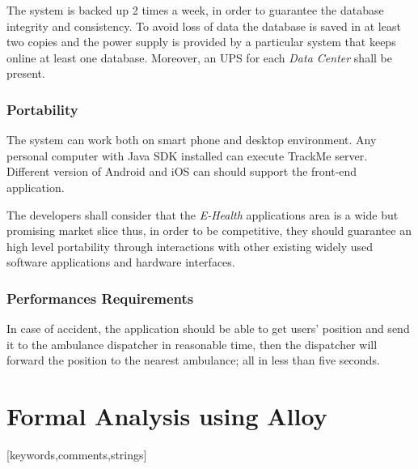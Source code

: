 \documentclass[a4paper]{article}
\begin{document}
        The system is backed up 2 times a  week, in order to guarantee the database integrity and consistency. To avoid loss of data  the database is saved in at least two copies and the power supply is provided by a particular system that keeps online at least one database. Moreover, an UPS for each \textit{Data Center} shall be present.
        
        \subsubsection{Portability}

        The system can work both on smart phone and desktop environment. Any personal computer with Java SDK installed can execute TrackMe server. Different version of Android and iOS can should support the front-end application.

        The developers shall consider that the \textit{E-Health} applications area is a wide but promising market slice thus, in order to be competitive, they should guarantee an high level portability through interactions with other existing widely used software applications and hardware interfaces.
        
        \subsubsection{Performances Requirements}
        
        In case of accident, the application should be able to get users' position and send it to the ambulance dispatcher in reasonable time, then the dispatcher will forward the position to the nearest ambulance; all in less than five seconds.
\newpage
\section{Formal Analysis using Alloy}
\renewcommand*{\lstlistlistingname}{Alloy model samples}
\lstlistoflistings
[keywords,comments,strings]
\end{document}
